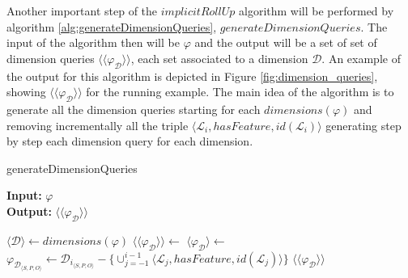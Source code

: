 \documentclass[12pt,a4paper]{report}
\newcommand\globalQuery{\varphi}
\newcommand\subject{S}
\newcommand\predicate{P}
\newcommand\object{O}
\newcommand\triple[1]{#1_{\set{\subject,\predicate,\object}}}
\newcommand\dimension{\mathcal{D}}
\newcommand\level{\mathcal{L}}
\newcommand\dimensions{dimensions}
\newcommand\id{id}
\newcommand\levels{levels}
\newcommand\set[1]{\langle #1 \rangle}
\newcommand\dimensionQuery{\globalQuery_{\dimension}}
\begin{document}
Another important step of the $implicitRollUp$ algorithm will be performed by algorithm \ref{alg:generateDimensionQueries}, $generateDimensionQueries$.
%
The input of the algorithm then will be $\globalQuery$ and the output will be a set of set of dimension queries $\set{\set{\dimensionQuery}}$, each set associated to a dimension $\dimension$.
%
An example of the output for this algorithm is depicted in Figure \ref{fig:dimension_queries}, showing $\set{\set{\dimensionQuery}}$ for the running example.
%
The main idea of the algorithm is to generate all the dimension queries starting for each $\dimensions(\globalQuery)$ and removing incrementally all the triple $\set{\level_{i},hasFeature,\id(\level_{i})}$ generating step by step each dimension query for each dimension.
%
\begin{algorithm}[ht]
\caption{generateDimensionQueries}\label{alg:generateDimensionQueries}
\textbf{Input:} $\globalQuery$\\
\textbf{Output:} $\set{\set{\dimensionQuery}}$
\begin{algorithmic}[1]
\State $\set{\dimension} \gets \dimensions(\globalQuery)$
\State $\set{\set{\dimensionQuery}} \gets $
\ForEach {$\dimension_{i} \in \set{\dimension}$}
    \State $\set{\dimensionQuery} \gets $
    \ForEach {$\level_{i} \in \levels(\dimension)$}
        \State $\triple{\dimensionQuery} \gets \triple{\dimension_{i}} - \{\cup_{j = -1}^{i - 1}\set{\level_{j},hasFeature,\id(\level_{j})}\}$
    \EndFor
\EndFor
\State \Return $\set{\set{\dimensionQuery}}$
\end{algorithmic}
\end{algorithm}
\end{document}
